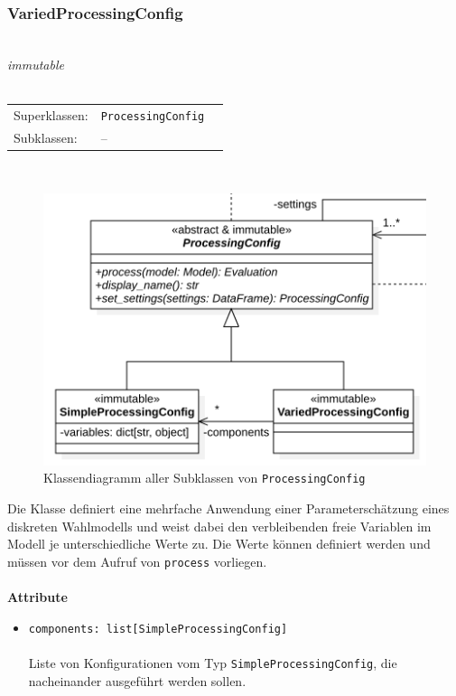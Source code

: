 \documentclass{article}
\begin{document}
\subsubsection*{\large{\textbf{VariedProcessingConfig}\label{cls:VariedProcessingConfig}}}\\
\textit{\flqq{}immutable\frqq}\normalsize\\\\
\begin{tabular}{lll}
 Superklassen: & \texttt{ProcessingConfig}\\
 Subklassen: & --
\end{tabular}\\
\begin{figure}[H]%
    \centering
    \includegraphics[width=13cm]{entwurf/Entwurf_dokument/img/cls/model/ProcessingConfigs.png}
    \caption{Klassendiagramm aller Subklassen von \texttt{ProcessingConfig}}
\end{figure}

Die Klasse definiert eine mehrfache Anwendung einer Parameterschätzung eines diskreten Wahlmodells und weist dabei den verbleibenden freie Variablen im Modell je unterschiedliche Werte zu. Die Werte können definiert werden und müssen vor dem Aufruf von \texttt{process} vorliegen.
\\\\

\textbf{Attribute}
\begin{itemize}\setlength\itemsep{3em}
\item \texttt{components: list[SimpleProcessingConfig]}\\\\
Liste von Konfigurationen vom Typ \texttt{SimpleProcessingConfig}, die nacheinander ausgeführt werden sollen.
\\\\
\end{itemize}
\end{document}
